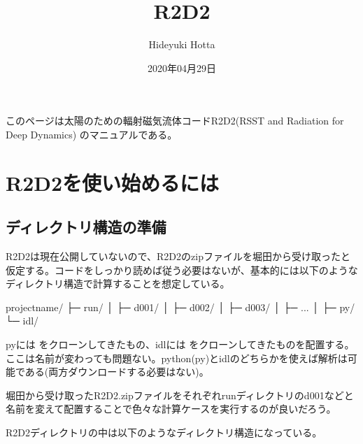 \documentclass[letterpaper,10pt,dvipdfmx,report]{sphinxmanual}
\title{R2D2}
\date{2020年04月29日}
\author{Hideyuki Hotta}
\let\sphinxpxdimen\pdfpxdimen\else\newdimen\sphinxpxdimen
\begin{document}
\pagestyle{empty}
\sphinxmaketitle
\pagestyle{plain}
\sphinxtableofcontents
\pagestyle{normal}
\label{\detokenize{index::doc}}


このページは太陽のための輻射磁気流体コードR2D2(RSST and Radiation for Deep Dynamics)
のマニュアルである。


\noindent\sphinxincludegraphics[width=350\sphinxpxdimen]{{R2D2_logo_red}.png}


\chapter{R2D2を使い始めるには}
\label{\detokenize{start:r2d2}}\label{\detokenize{start::doc}}

\section{ディレクトリ構造の準備}
\label{\detokenize{start:id1}}
R2D2は現在公開していないので、R2D2のzipファイルを堀田から受け取ったと仮定する。コードをしっかり読めば従う必要はないが、基本的には以下のようなディレクトリ構造で計算することを想定している。

\begin{sphinxVerbatim}[commandchars=\\\{\}]
project\PYGZus{}name/
           ├─ run/
           │    ├─ d001/
           │    ├─ d002/
           │    ├─ d003/
           │    ├─ ...
           │
           ├─ py/
           └─ idl/
\end{sphinxVerbatim}

pyには  をクローンしてきたもの、idlには  をクローンしてきたものを配置する。ここは名前が変わっても問題ない。python(py)とidlのどちらかを使えば解析は可能である(両方ダウンロードする必要はない)。

堀田から受け取ったR2D2.zipファイルをそれぞれrunディレクトリのd001などと名前を変えて配置することで色々な計算ケースを実行するのが良いだろう。

R2D2ディレクトリの中は以下のようなディレクトリ構造になっている。
\end{document}

